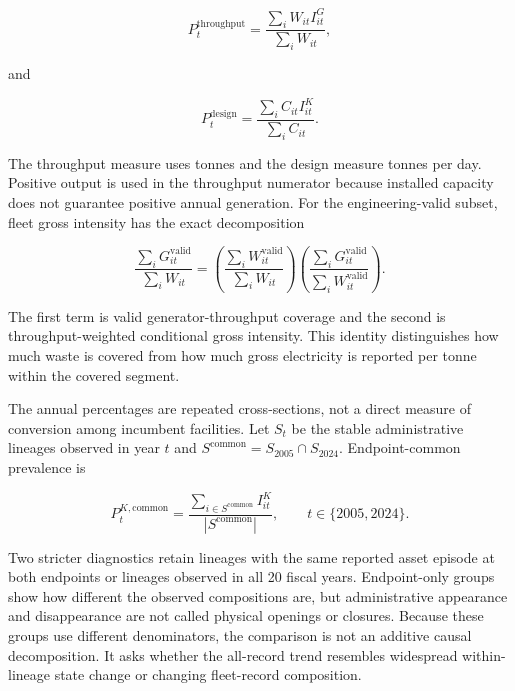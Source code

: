 \documentclass[12pt,a4paper]{article}
\begin{document}
\begin{equation}
P_t^{\mathrm{throughput}}=
\frac{\sum_i W_{it}I_{it}^{G}}{\sum_i W_{it}},
\label{eq:throughput-coverage}
\end{equation}

and

\begin{equation}
P_t^{\mathrm{design}}=
\frac{\sum_i C_{it}I_{it}^{K}}{\sum_i C_{it}}.
\label{eq:design-coverage}
\end{equation}

The throughput measure uses tonnes and the design measure tonnes per day.
Positive output is used in the throughput numerator because installed capacity
does not guarantee positive annual generation. For the
engineering-valid subset, fleet gross intensity has the exact decomposition

\begin{equation}
\frac{\sum_i G_{it}^{\mathrm{valid}}}{\sum_i W_{it}}
=
\left(\frac{\sum_i W_{it}^{\mathrm{valid}}}{\sum_i W_{it}}\right)
\left(\frac{\sum_i G_{it}^{\mathrm{valid}}}
{\sum_i W_{it}^{\mathrm{valid}}}\right).
\label{eq:fleet-decomposition}
\end{equation}

The first term is valid generator-throughput coverage and the second is
throughput-weighted conditional gross intensity. This identity distinguishes
how much waste is covered from how much gross electricity is reported per tonne
within the covered segment.

The annual percentages are repeated cross-sections, not a direct measure of
conversion among incumbent facilities. Let $S_t$ be the stable administrative
lineages observed in year $t$ and
$S^{\mathrm{common}}=S_{2005}\cap S_{2024}$. Endpoint-common prevalence is

\begin{equation}
P_t^{K,\mathrm{common}}=
\frac{\sum_{i\in S^{\mathrm{common}}}I_{it}^{K}}
{|S^{\mathrm{common}}|},\qquad t\in\{2005,2024\}.
\label{eq:endpoint-common}
\end{equation}

Two stricter diagnostics retain lineages with the same reported asset episode
at both endpoints or lineages observed in all 20 fiscal years. Endpoint-only
groups show how different the observed compositions are, but administrative
appearance and disappearance are not called physical openings or closures.
Because these groups use different denominators, the comparison is not an
additive causal decomposition. It asks whether the all-record trend resembles
widespread within-lineage state change or changing fleet-record composition.
\end{document}
